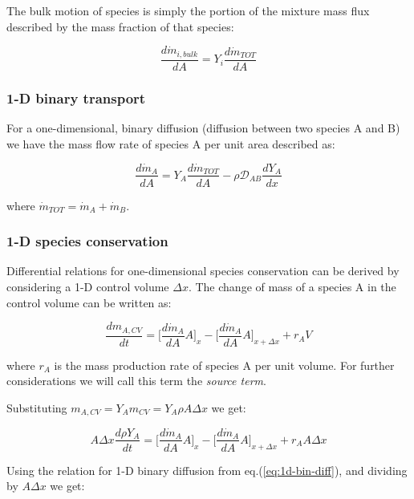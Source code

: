 \documentclass[10pt,twocolumn]{article}
\begin{document}
The bulk motion of species is simply the portion of the mixture mass flux described by the mass fraction of that species:

\begin{equation}
\frac{d \dot{m}_{i, bulk}}{dA} = Y_i \frac{d \dot{m}_{TOT}}{d A}
\end{equation}

\subsubsection{1-D binary transport}

For a one-dimensional, binary diffusion (diffusion between two species A and B) we have the mass flow rate of species A per unit area described as:

\begin{equation}
\frac{d \dot{m}_A }{dA} = Y_A \frac{d \dot{m}_{TOT}}{d A} - \rho \mathcal{D}_{AB} \frac{dY_A}{dx}
\end{equation}\label{eq:1d-bin-diff}

where $\dot{m}_{TOT} = \dot{m}_A + \dot{m}_B$.

\subsubsection{1-D species conservation}

Differential relations for one-dimensional species conservation can be derived by considering a 1-D control volume $\Delta x$. The change of mass of a species A in the control volume can be written as:

\begin{equation}
\frac{d m_{A, CV} }{dt} = \Big[ \frac{d \dot{m}_A}{d A} A \Big]_x - \Big[ \frac{d \dot{m}_A}{d A} A \Big]_{x + \Delta x} + r_A V
\end{equation}

where $r_A$ is the mass production rate of species A per unit volume. For further considerations we will call this term the \textit{source term}.

Substituting $m_{A, CV} = Y_A m_{CV} = Y_A \rho A \Delta x$ we get:

\begin{equation}
A \Delta x \frac{d \rho Y_{A} }{dt} = \Big[ \frac{d \dot{m}_A}{d A} A \Big]_x - \Big[ \frac{d \dot{m}_A}{d A} A \Big]_{x + \Delta x} + r_A A \Delta x
\end{equation}

Using the relation for 1-D binary diffusion from eq.(\ref{eq:1d-bin-diff}), and dividing by $A \Delta x$ we get:
\end{document}
